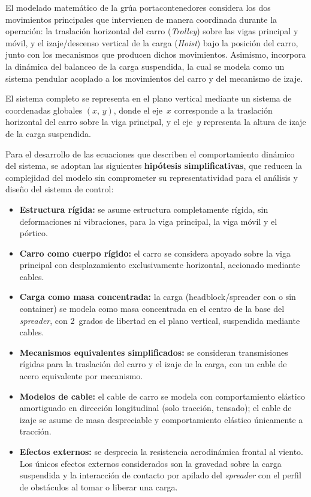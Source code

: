 \documentclass[12pt, a4paper]{article}
\begin{document}
El modelado matemático de la grúa portacontenedores considera los dos movimientos principales que
intervienen de manera coordinada durante la operación: la traslación horizontal del carro
(\textit{Trolley}) sobre las vigas principal y móvil, y el izaje/descenso vertical de la carga
(\textit{Hoist}) bajo la posición del carro, junto con los mecanismos que producen dichos movimientos.
Asimismo, incorpora la dinámica del balanceo de la carga suspendida, la cual se modela como un sistema
pendular acoplado a los movimientos del carro y del mecanismo de izaje.

El sistema completo se representa en el plano vertical mediante un sistema de coordenadas globales
$(x,\,y)$, donde el eje~$x$ corresponde a la traslación horizontal del carro sobre la viga principal,
y el eje~$y$ representa la altura de izaje de la carga suspendida.

Para el desarrollo de las ecuaciones que describen el comportamiento dinámico del sistema, se adoptan
las siguientes \textbf{hipótesis simplificativas}, que reducen la complejidad del modelo sin comprometer
su representatividad para el análisis y diseño del sistema de control:

\begin{itemize}
    \item \textbf{Estructura rígida:} se asume estructura completamente rígida, sin deformaciones
    ni vibraciones, para la viga principal, la viga móvil y el pórtico.

    \item \textbf{Carro como cuerpo rígido:} el carro se considera apoyado sobre la viga principal
    con desplazamiento exclusivamente horizontal, accionado mediante cables.

    \item \textbf{Carga como masa concentrada:} la carga (headblock/spreader con o sin container)
    se modela como masa concentrada en el centro de la base del \textit{spreader}, con 2~grados de
    libertad en el plano vertical, suspendida mediante cables.

    \item \textbf{Mecanismos equivalentes simplificados:} se consideran transmisiones rígidas para
    la traslación del carro y el izaje de la carga, con un cable de acero equivalente por mecanismo.

    \item \textbf{Modelos de cable:} el cable de carro se modela con comportamiento elástico amortiguado
    en dirección longitudinal (solo tracción, tensado); el cable de izaje se asume de masa
    despreciable y comportamiento elástico únicamente a tracción.

    \item \textbf{Efectos externos:} se desprecia la resistencia aerodinámica frontal al viento.
    Los únicos efectos externos considerados son la gravedad sobre la carga suspendida y la
    interacción de contacto por apilado del \textit{spreader} con el perfil de obstáculos
    al tomar o liberar una carga.
\end{itemize}
\end{document}
